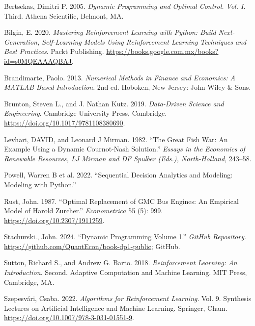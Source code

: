 \documentclass[
  letterpaper,
]{krantz}
\newlength{\cslhangindent}
\newenvironment{CSLReferences}[2] %
 {\begin{list}{}{%
  \setlength{\itemindent}{0pt}
  \setlength{\leftmargin}{0pt}
  \setlength{\parsep}{0pt}
  \ifodd #1
   \setlength{\leftmargin}{\cslhangindent}
   \setlength{\itemindent}{-1\cslhangindent}
  \fi
  \setlength{\itemsep}{#2\baselineskip}}}
 {\end{list}}
\theoremstyle{plain}
\theoremstyle{definition}
\theoremstyle{definition}
\theoremstyle{remark}
\begin{document}
\label{refs}
\begin{CSLReferences}{1}{0}
Bertsekas, Dimitri P. 2005. \emph{Dynamic Programming and Optimal
Control. {V}ol. {I}}. Third. Athena Scientific, Belmont, MA.

Bilgin, E. 2020. \emph{Mastering Reinforcement Learning with Python:
Build Next-Generation, Self-Learning Models Using Reinforcement Learning
Techniques and Best Practices}. Packt Publishing.
\url{https://books.google.com.mx/books?id=s0MQEAAAQBAJ}.

Brandimarte, Paolo. 2013. \emph{Numerical Methods in Finance and
Economics: A MATLAB-Based Introduction}. 2nd ed. Hoboken, New Jersey:
John Wiley \& Sons.

Brunton, Steven L., and J. Nathan Kutz. 2019. \emph{Data-Driven Science
and Engineering}. Cambridge University Press, Cambridge.
\url{https://doi.org/10.1017/9781108380690}.

Levhari, DAVID, and Leonard J Mirman. 1982. {``The Great Fish War: An
Example Using a Dynamic Cournot-Nash Solution.''} \emph{Essays in the
Economics of Renewable Resources, LJ Mirman and DF Spulber (Eds.),
North-Holland}, 243--58.

Powell, Warren B et al. 2022. {``Sequential Decision Analytics and
Modeling: Modeling with Python.''}

Rust, John. 1987. {``{Optimal Replacement of GMC Bus Engines: An
Empirical Model of Harold Zurcher}.''} \emph{Econometrica} 55 (5): 999.
\url{https://doi.org/10.2307/1911259}.

Stachurski., John. 2024. {``Dynamic Programming Volume 1.''}
\emph{GitHub Repository}.
\url{https://github.com/QuantEcon/book-dp1-public}; GitHub.

Sutton, Richard S., and Andrew G. Barto. 2018. \emph{Reinforcement
Learning: An Introduction}. Second. Adaptive Computation and Machine
Learning. MIT Press, Cambridge, MA.

Szepesvári, Csaba. 2022. \emph{Algorithms for Reinforcement Learning}.
Vol. 9. Synthesis Lectures on Artificial Intelligence and Machine
Learning. Springer, Cham.
\url{https://doi.org/10.1007/978-3-031-01551-9}.

\end{CSLReferences}



\backmatter
\printindex
\end{document}
